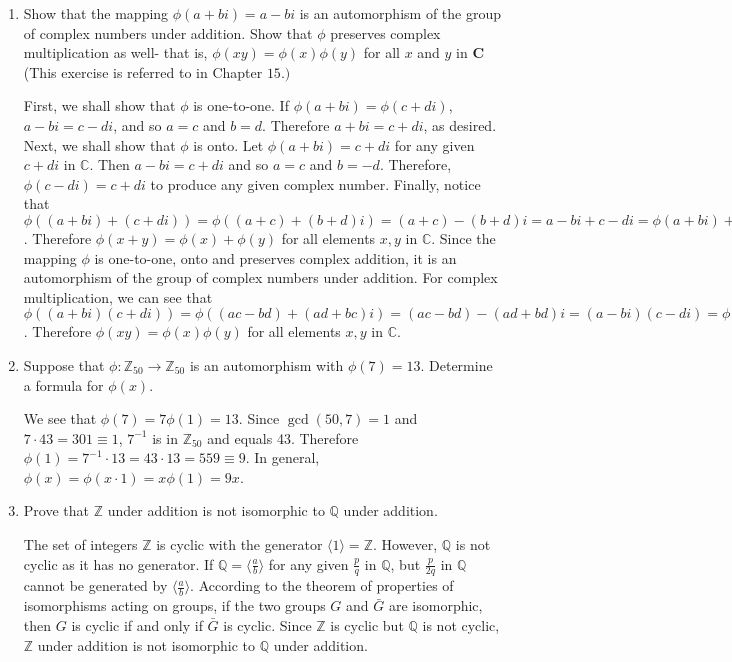 \documentclass{article}
\newcommand{\Z}{\mathbb Z}
\newcommand{\Q}{\mathbb Q}
\newcommand{\C}{\mathbb C}
\begin{document}
\begin{enumerate}
\begin{flushleft}
    \end{flushleft}
    \item Show that the mapping $\phi(a + b i) = a - b i$ is an automorphism of the group of complex numbers under addition. Show that $\phi$ preserves complex multiplication as well- that is, $\phi(x y) = \phi(x) \phi(y)$ for all $x$ and $y$ in $\mathbf{C}$ (This exercise is referred to in Chapter $15.)$
    \begin{flushleft}
    First, we shall show that $\phi$ is one-to-one. If $\phi(a + bi) = \phi(c + di)$, $a - bi = c - di$, and so $a = c$ and $b = d$. Therefore $a + bi = c + di$, as desired. Next, we shall show that $\phi$ is onto. Let $\phi(a + bi) = c + di$ for any given $c + di$ in $\C$. Then $a - bi = c + di$ and so $a = c$ and $b = -d$. Therefore, $\phi(c - di) = c + di$ to produce any given complex number. Finally, notice that $\phi((a + bi)+(c + di)) = \phi((a+c) + (b+d)i) = (a+c) - (b+d)i = a - bi + c - di = \phi(a+bi) + \phi(c+di)$. Therefore $\phi(x + y) = \phi(x) + \phi(y)$ for all elements $x, y$ in $\C$. Since the mapping $\phi$ is one-to-one, onto and preserves complex addition, it is an automorphism of the group of complex numbers under addition. For complex multiplication, we can see that $\phi((a + bi)(c + di)) = \phi((ac - bd)+(ad+bc)i) = (ac - bd) - (ad+bd)i = (a - bi)(c - di) = \phi(a+bi)\phi(c+di)$. Therefore $\phi(xy) = \phi(x)\phi(y)$ for all elements $x, y$ in $\C$.
    \end{flushleft}
    \item Suppose that $\phi : \Z_{50} \rightarrow \Z_{50}$ is an automorphism with $\phi(7) = 13$. Determine a formula for $\phi(x)$.
    \begin{flushleft}
    We see that $\phi(7) = 7\phi(1) = 13$. Since $\gcd(50,7) = 1$ and $7 \cdot 43 = 301 \equiv 1$, $7^{-1}$ is in $\Z_{50}$ and equals 43. Therefore $\phi(1) = 7^{-1} \cdot 13 = 43 \cdot 13 = 559 \equiv 9$. In general, $\phi(x) = \phi(x \cdot 1) = x\phi(1) = 9x$.
    \end{flushleft}
    \item Prove that $\Z$ under addition is not isomorphic to $\Q$ under addition.
    \begin{flushleft}
    The set of integers $\Z$ is cyclic with the generator $\langle1\rangle = \Z$. However, $\Q$ is not cyclic as it has no generator. If $\Q = \langle\frac{a}{b}\rangle$ for any given $\frac{p}{q}$ in $\Q$, but $\frac{p}{2q}$ in $\Q$ cannot be generated by $\langle\frac{a}{b}\rangle$. According to the theorem of properties of isomorphisms acting on groups, if the two groups $G$ and $\bar{G}$ are isomorphic, then $G$ is cyclic if and only if $\bar{G}$ is cyclic. Since $\Z$ is cyclic but $\Q$ is not cyclic, $\Z$ under addition is not isomorphic to $\Q$ under addition.

\end{flushleft}
\end{enumerate}
\end{document}
